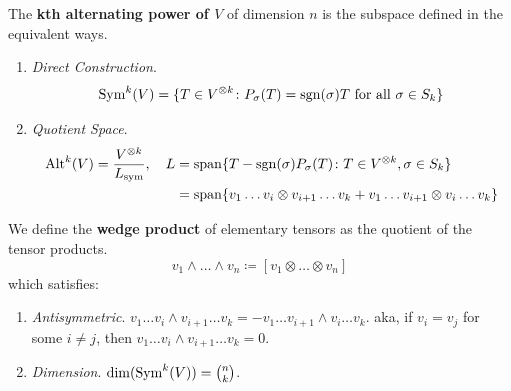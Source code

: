	\begin{definition}
	  \label{def:alternating-power}
		The \textbf{kth alternating power of $V$} of dimension $n$ is the subspace defined in the equivalent ways. 
		\begin{enumerate}
		  \item \textit{Direct Construction}. 
				\begin{equation}
					\operatorname{Sym}^k (V) = \{T \in V^{\otimes k} \colon P_\sigma(T) = \operatorname{sgn}(\sigma) T \text{ for all } \sigma \in S_k \}
				\end{equation}

			\item \textit{Quotient Space}. 
				\begin{align}
					\operatorname{Alt}^k (V) = \frac{V^{\otimes k}}{L_{\mathrm{sym}}}, \quad L 
						& = \mathrm{span} \{ T - \operatorname{sgn}(\sigma) P_\sigma(T) \colon T \in V^{\otimes k}, \sigma \in S_k \} \\ 
						& = \mathrm{span} \{ v_1 \ldots v_i \otimes v_{i+1} \ldots v_k + v_1 \ldots v_{i+1} \otimes v_i \ldots v_k\}
				\end{align}
		\end{enumerate}
		We define the \textbf{wedge product} of elementary tensors as the quotient of the tensor products.  
		\begin{equation}
			v_1 \wedge \ldots \wedge v_n \coloneqq [v_1 \otimes \ldots \otimes v_n] 
		\end{equation}
		which satisfies: 
		\begin{enumerate}
			\item \textit{Antisymmetric}. $v_1 \ldots v_i \wedge v_{i+1} \ldots v_k = - v_1 \ldots v_{i+1} \wedge v_i \ldots v_k$. aka, if $v_i = v_j$ for some $i \neq j$, then $v_1 \ldots v_i \wedge v_{i+1} \ldots v_k = 0$. 
			\item \textit{Dimension}. $\dim(\operatorname{Sym}^k (V)) = \binom{n}{k}$. 
		\end{enumerate}
	\end{definition}
